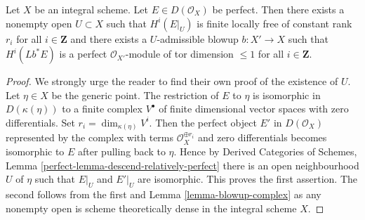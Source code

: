 \begin{lemma}
\label{lemma-blowup-complex-integral}
Let $X$ be an integral scheme. Let $E \in D(\mathcal{O}_X)$ be perfect.
Then there exists a nonempty open $U \subset X$
such that $H^i(E|_U)$ is finite locally free of constant rank $r_i$
for all $i \in \mathbf{Z}$ and there exists a $U$-admissible blowup
$b : X' \to X$ such that $H^i(Lb^*E)$ is a perfect
$\mathcal{O}_{X'}$-module of tor dimension $\leq 1$ for all $i \in \mathbf{Z}$.
\end{lemma}

\begin{proof}
We strongly urge the reader to find their own proof of the
existence of $U$. Let $\eta \in X$ be the generic point.
The restriction of $E$ to $\eta$ is isomorphic in $D(\kappa(\eta))$ to a
finite complex $V^\bullet$ of finite dimensional vector spaces with zero
differentials. Set $r_i = \dim_{\kappa(\eta)} V^i$.
Then the perfect object $E'$ in $D(\mathcal{O}_X)$ represented by the complex
with terms $\mathcal{O}_X^{\oplus r_i}$ and zero differentials
becomes isomorphic to $E$ after pulling back to $\eta$.
Hence by Derived Categories of Schemes, Lemma
\ref{perfect-lemma-descend-relatively-perfect}
there is an open neighbourhood $U$ of $\eta$ such that $E|_U$ and $E'|_U$
are isomorphic. This proves the first assertion. The second follows from the
first and Lemma \ref{lemma-blowup-complex} as any nonempty open is
scheme theoretically dense in the integral scheme $X$.
\end{proof}

